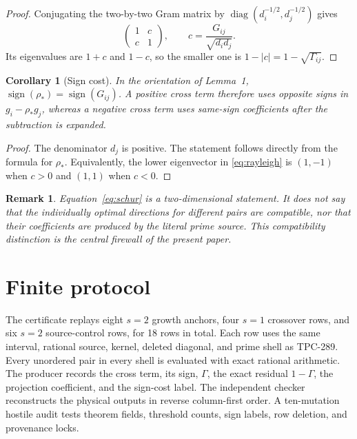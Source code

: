 \documentclass[10pt]{article}
\newtheorem{corollary}{Corollary}
\newtheorem{remark}{Remark}
\begin{document}
\begin{proof}
Conjugating the two-by-two Gram matrix by
$\operatorname{diag}(d_i^{-1/2},d_j^{-1/2})$ gives
\[
 \begin{pmatrix}1&c\\c&1\end{pmatrix},
 \qquad c=\frac{G_{ij}}{\sqrt{d_id_j}}.
\]
Its eigenvalues are $1+c$ and $1-c$, so the smaller one is
$1-|c|=1-\sqrt{\Gamma_{ij}}$.
\end{proof}

\begin{corollary}[Sign cost]
In the orientation of Lemma~1, $\operatorname{sign}(\rho_*)=
\operatorname{sign}(G_{ij})$.  A positive cross term therefore uses
opposite signs in $g_i-\rho_*g_j$, whereas a negative cross term uses
same-sign coefficients after the subtraction is expanded.
\end{corollary}

\begin{proof}
The denominator $d_j$ is positive.  The statement follows directly from
the formula for $\rho_*$.  Equivalently, the lower eigenvector in
\eqref{eq:rayleigh} is $(1,-1)$ when $c>0$ and $(1,1)$ when $c<0$.
\end{proof}

\begin{remark}
Equation~\eqref{eq:schur} is a two-dimensional statement.  It does not say
that the individually optimal directions for different pairs are compatible,
nor that their coefficients are produced by the literal prime source.  This
compatibility distinction is the central firewall of the present paper.
\end{remark}

\section{Finite protocol}

The certificate replays eight $s=2$ growth anchors, four $s=1$ crossover
rows, and six $s=2$ source-control rows, for 18 rows in total.  Each row
uses the same interval, rational source, kernel, deleted diagonal, and prime
shell as TPC-289.  Every unordered pair in every shell is evaluated with
exact rational arithmetic.  The producer records the cross term, its sign,
$\Gamma$, the exact residual $1-\Gamma$, the projection coefficient, and the
sign-cost label.  The independent checker reconstructs the physical outputs
in reverse column-first order.  A ten-mutation hostile audit tests theorem
fields, threshold counts, sign labels, row deletion, and provenance locks.
\end{document}
